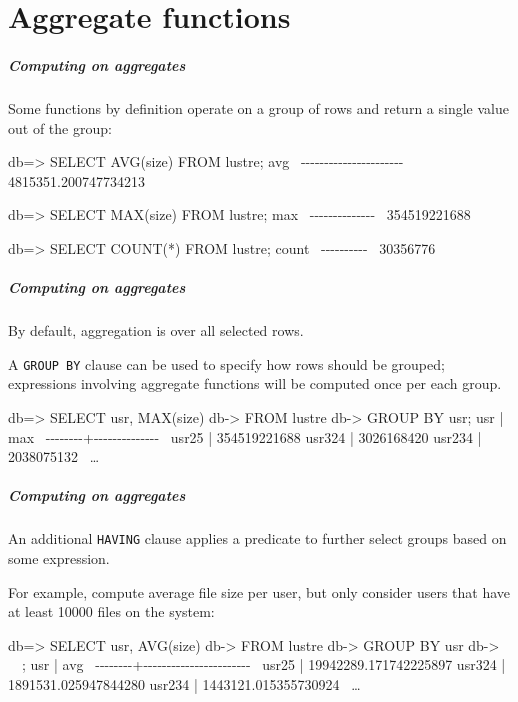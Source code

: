\documentclass[english,serif,mathserif]{beamer}
\begin{document}


\part{Aggregate functions}

\begin{frame}[fragile]
  \frametitle{Computing on aggregates}

  Some functions by definition operate on a group of rows and return a single
  value out of the group:

  \+
  \begin{sql}
db=> SELECT AVG(size) FROM lustre;
         avg
~-{}-{}-{}-{}-{}-{}-{}-{}-{}-{}-{}-{}-{}-{}-{}-{}-{}-{}-{}-{}-{}-{}~
 4815351.200747734213

db=> SELECT MAX(size) FROM lustre;
     max
~-{}-{}-{}-{}-{}-{}-{}-{}-{}-{}-{}-{}-{}-{}~
  354519221688

db=> SELECT COUNT(*) FROM lustre;
  count
~-{}-{}-{}-{}-{}-{}-{}-{}-{}-{}~
 30356776
\end{sql}
\end{frame}


\begin{frame}[fragile]
  \frametitle{Computing on aggregates}

  By default, aggregation is over all selected rows.

  \+
  A \texttt{GROUP BY} clause can be used to specify how rows should be grouped;
  expressions involving aggregate functions will be computed once per each group.

  \+
  \begin{sql}
 db=> SELECT usr, MAX(size)
 db-> FROM lustre
 db-> GROUP BY usr;
  usr   |     max
~-{}-{}-{}-{}-{}-{}-{}-{}+{}-{}-{}-{}-{}-{}-{}-{}-{}-{}-{}-{}-{}-{}-{}~
 usr25  | 354519221688
 usr324 |   3026168420
 usr234 |   2038075132
 ~{\ldots}~
\end{sql}

\end{frame}


\begin{frame}[fragile]
  \frametitle{Computing on aggregates}

  An additional \texttt{HAVING} clause applies a predicate to further select
  groups based on some expression.

  \+
  For example, compute average file size per user, but only consider users that
  have at least 10000 files on the system:
  \begin{sql}
 db=> SELECT usr, AVG(size)
 db-> FROM lustre
 db-> GROUP BY usr
 db-> ~~;
  usr   |          avg
~-{}-{}-{}-{}-{}-{}-{}-{}+{}-{}-{}-{}-{}-{}-{}-{}-{}-{}-{}-{}-{}-{}-{}-{}-{}-{}-{}-{}-{}-{}-{}-{}~
 usr25  | 19942289.171742225897
 usr324 |  1891531.025947844280
 usr234 |  1443121.015355730924
 ~{\ldots}~
\end{sql}
\end{frame}
\end{document}
